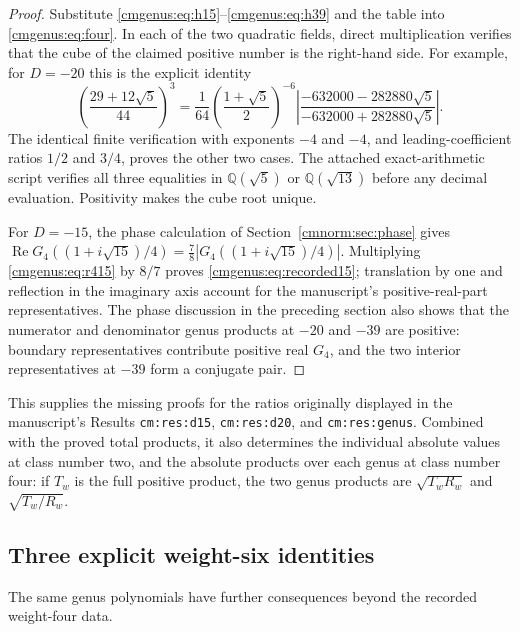 \begin{proof}
Substitute \eqref{cmgenus:eq:h15}--\eqref{cmgenus:eq:h39} and the table
into \eqref{cmgenus:eq:four}. In each of the two quadratic fields,
direct multiplication verifies that the cube of the claimed positive
number is the right-hand side. For example, for $D=-20$ this is the
explicit identity
\[
 \left(\frac{29+12\sqrt5}{44}\right)^3
 =\frac1{64}\left(\frac{1+\sqrt5}{2}\right)^{-6}
   \left|\frac{-632000-282880\sqrt5}
                  {-632000+282880\sqrt5}\right|.
\]
The identical finite verification with exponents $-4$ and $-4$, and
leading-coefficient ratios $1/2$ and $3/4$, proves the other two cases.
The attached exact-arithmetic script verifies all three equalities in
$\mathbb Q(\sqrt5)$ or $\mathbb Q(\sqrt{13})$ before any decimal
evaluation. Positivity makes the cube root unique.

For $D=-15$, the phase calculation of
Section~\ref{cmnorm:sec:phase} gives
$\operatorname{Re}G_4((1+i\sqrt{15})/4)
=\tfrac78|G_4((1+i\sqrt{15})/4)|$.
Multiplying \eqref{cmgenus:eq:r415} by $8/7$ proves
\eqref{cmgenus:eq:recorded15}; translation by one and reflection in the
imaginary axis account for the manuscript's positive-real-part
representatives. The phase discussion in the preceding section also
shows that the numerator and denominator genus products at $-20$ and
$-39$ are positive: boundary representatives contribute positive real
$G_4$, and the two interior representatives at $-39$ form a conjugate
pair.
\end{proof}

This supplies the missing proofs for the ratios originally displayed
in the manuscript's Results \texttt{cm:res:d15},
\texttt{cm:res:d20}, and \texttt{cm:res:genus}.
Combined with the proved total products, it also determines the
individual absolute values at class number two, and the absolute
products over each genus at class number four: if $T_w$ is the full
positive product, the two genus products are
$\sqrt{T_wR_w}$ and $\sqrt{T_w/R_w}$.

\subsection{Three explicit weight-six identities}

The same genus polynomials have further consequences beyond the
recorded weight-four data.

